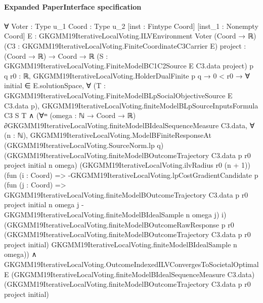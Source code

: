 \documentclass[10pt]{article}
\begin{document}
\paragraph{Expanded PaperInterface specification}
\begin{ReviewVerbatim}
∀ {Voter : Type u_1} {Coord : Type u_2} [inst : Fintype Coord] [inst_1 : Nonempty Coord]
  {E : GKGMM19IterativeLocalVoting.ILVEnvironment Voter (Coord → ℝ)}
  (C3 : GKGMM19IterativeLocalVoting.FiniteCoordinateC3Carrier E) {project : (Coord → ℝ) → Coord → ℝ}
  (S : GKGMM19IterativeLocalVoting.FiniteModelBC1C2Source E C3.data project) {p q r0 : ℝ},
  GKGMM19IterativeLocalVoting.HolderDualFinite p q →
    0 < r0 →
      ∀ initial ∈ E.solutionSpace,
        ∀ (T : GKGMM19IterativeLocalVoting.FiniteModelBLpSocialObjectiveSource E C3.data p),
          GKGMM19IterativeLocalVoting.finiteModelBLpSourceInputsFormula C3 S T ∧
            (∀ᵐ (omega : ℕ → Coord → ℝ) ∂GKGMM19IterativeLocalVoting.finiteModelBIdealSequenceMeasure C3.data,
                ∀ (n : ℕ),
                  GKGMM19IterativeLocalVoting.ModelBFiniteResponseAt (GKGMM19IterativeLocalVoting.SourceNorm.lp q)
                    (GKGMM19IterativeLocalVoting.finiteModelBOutcomeTrajectory C3.data p r0 project initial n omega)
                    (GKGMM19IterativeLocalVoting.ilvRadius r0 (n + 1))
                    (fun (i : Coord) =>
                      -GKGMM19IterativeLocalVoting.lpCostGradientCandidate p
                          (fun (j : Coord) =>
                            GKGMM19IterativeLocalVoting.finiteModelBOutcomeTrajectory C3.data p r0 project initial n
                                omega j -
                              GKGMM19IterativeLocalVoting.finiteModelBIdealSample n omega j)
                          i)
                    (GKGMM19IterativeLocalVoting.finiteModelBOutcomeRawResponse p r0
                      (GKGMM19IterativeLocalVoting.finiteModelBOutcomeTrajectory C3.data p r0 project initial)
                      GKGMM19IterativeLocalVoting.finiteModelBIdealSample n omega)) ∧
              GKGMM19IterativeLocalVoting.OutcomeIndexedILVConvergesToSocietalOptimal E
                (GKGMM19IterativeLocalVoting.finiteModelBIdealSequenceMeasure C3.data)
                (GKGMM19IterativeLocalVoting.finiteModelBOutcomeTrajectory C3.data p r0 project initial)
\end{ReviewVerbatim}
\end{document}
